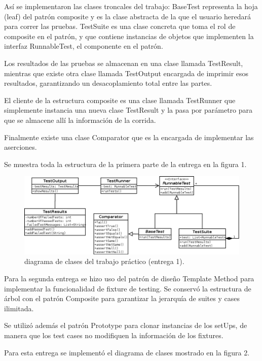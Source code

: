 \documentclass[12pt]{article}
\begin{document}
Así se implementaron las clases troncales del trabajo: BaseTest representa la 
hoja (leaf) del patrón composite y es la clase abstracta de la que el usuario 
heredará para correr las pruebas. TestSuite es una clase concreta que toma el 
rol de composite en el patrón, y que contiene instancias de objetos que 
implementen la interfaz RunnableTest, el componente en el patrón.

Los resultados de las pruebas se almacenan en una clase llamada TestResult,
mientras que existe otra clase llamada TestOutput encargada de imprimir esos
resultados, garantizando un desacoplamiento total entre las partes.

El cliente de la estructura composite es una clase llamada TestRunner que
simplemente instancia una nueva clase TestResult y la pasa por parámetro para 
que se almacene allí la información de la corrida.

Finalmente existe una clase Comparator que es la encargada de implementar las 
aserciones.

Se muestra toda la estructura de la primera parte de la entrega en la figura 1.

\begin{figure}[h!]
\begin{center}
	\includegraphics[scale=0.50,angle=90]{./ClassDiagram}
\end{center}
	\caption{diagrama de clases del trabajo práctico (entrega 1).}
\end{figure}

Para la segunda entrega se hizo uso del patrón de diseño Template Method para 
implementar la funcionalidad de fixture de testing. Se conservó la estructura
de árbol con el patrón Composite para garantizar la jerarquía de suites y cases
ilimitada.

Se utilizó además el patrón Prototype para clonar instancias de los setUps, de
manera que los test cases no modifiquen la información de los fixtures.

Para esta entrega se implementó el diagrama de clases mostrado en la figura 2.
\end{document}
